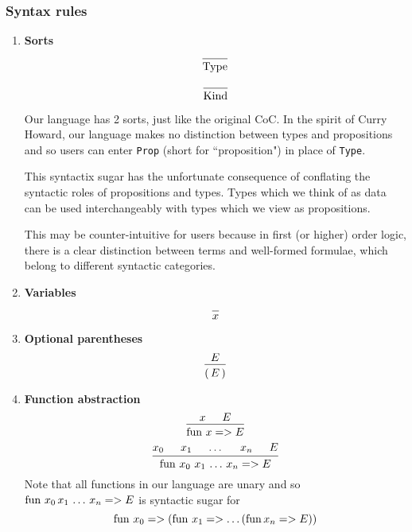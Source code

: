 \documentclass{article}
\begin{document}
\subsubsection{Syntax rules}
\begin{enumerate}
\item \textbf{Sorts} \\
  \[
    \begin{prooftree}
      \infer0{\Type}
    \end{prooftree}
  \]

  \[
    \begin{prooftree}
      \infer0{\Kind}
    \end{prooftree}
  \]

  Our language has 2 sorts, just like the original CoC. In the spirit of Curry
  Howard, our language makes no distinction between types and propositions and
  so users can enter \verb|Prop| (short for ``proposition") in place of \verb|Type|.

  This syntactix sugar has the unfortunate consequence of conflating the syntactic
  roles of propositions and types.
  Types which we think of as data can be used interchangeably with types which
  we view as propositions.
  
  This may be counter-intuitive for users because in first (or higher) order
  logic, there is a clear distinction between terms and well-formed formulae,
  which belong to different syntactic categories.

\item \textbf{Variables} \\
  \[
    \begin{prooftree}
      \infer0{x}
    \end{prooftree}
  \]

\item \textbf{Optional parentheses} \\
  \[
    \begin{prooftree}
      \hypo{E}
      \infer1{( \, E \, )}
    \end{prooftree}
  \]
  
\item \textbf{Function abstraction} \\
  \[
    \begin{prooftree}
      \hypo{x}
      \hypo{E}
      \infer2{\fun \, x => E}
    \end{prooftree}
  \]
  \[
    \begin{prooftree}
      \hypo{x_0}
      \hypo{x_1}
      \hypo{\dots}
      \hypo{x_n}
      \hypo{E}
      \infer5{\fun \, x_0 \,\, x_1 \, \dots \, x_n => E}
    \end{prooftree}
  \]
  Note that all functions in our language are unary and so
  $\operatorname{fun} \, x_0 \, x_1 \, \dots \, x_n => E$ is syntactic sugar for
  \[ \operatorname{fun} \, x_0 => (\operatorname{fun} \, x_1 => \dots (\operatorname{fun} x_n => E)) \]


\end{enumerate}
\end{document}

